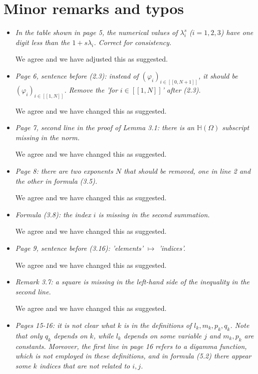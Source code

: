 \documentclass[11 pt]{article}
\numberwithin{equation}{section}
\begin{document}
\section*{Minor remarks and typos}

\begin{itemize}
    \item \emph{In the table shown in page 5, the numerical values of \(\lambda_{i}^{s}\) (\(i=1,2,3\)) have one digit less than the \(1+s\lambda_{i}\). Correct for consistency.}

    We agree and we have adjusted this as suggested.

    \item \emph{Page 6, sentence before (2.3): instead of \((\varphi_{i})_{i\in[[0,N+1]]}\), it should be \((\varphi_{i})_{i\in[[1,N]]}\). Remove the 'for \(i\in[[1,N]]\)' after (2.3).}

    We agree and we have changed this as suggested.

    \item \emph{Page 7, second line in the proof of Lemma 3.1: there is an \({\mathbb{H}}(\Omega)\) subscript missing in the norm.}

    We agree and we have changed this as suggested.

    \item \emph{Page 8: there are two exponents \(N\) that should be removed, one in line 2 and the other in formula (3.5).}

        We agree and we have changed this as suggested.

    \item \emph{Formula (3.8): the index \(i\) is missing in the second summation.}

    We agree and we have changed this as suggested.

    \item \emph{Page 9, sentence before (3.16): 'elements' \(\mapsto\) 'indices'.}

    We agree and we have changed this as suggested.

    \item \emph{Remark 3.7: a square is missing in the left-hand side of the inequality in the second line.}

    We agree and we have changed this as suggested.

    \item \emph{Pages 15-16: it is not clear what \(k\) is in the definitions of \(l_{k},m_{k},p_{k},q_{k}\). Note that only \(q_{k}\) depends on \(k\), while \(l_{k}\) depends on some variable \(j\) and \(m_{k},p_{k}\) are constants. Moreover, the first line in page 16 refers to a digamma function, which is not employed in these definitions, and in formula (5.2) there appear some \(k\) indices that are not related to \(i,j\).}


\end{itemize}
\end{document}
